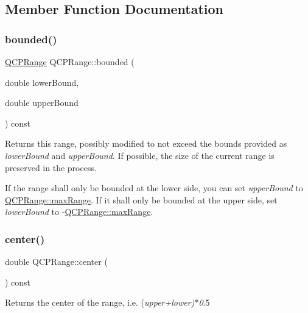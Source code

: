 \subsection{Member Function Documentation}
\mbox{\label{class_q_c_p_range_a22151e18d961d762d25721211e89c2e5}} 
\subsubsection{\texorpdfstring{bounded()}{bounded()}}
{\footnotesize\ttfamily \hyperlink{class_q_c_p_range}{Q\+C\+P\+Range} Q\+C\+P\+Range\+::bounded (\begin{DoxyParamCaption}\item[{double}]{lower\+Bound,  }\item[{double}]{upper\+Bound }\end{DoxyParamCaption}) const}

Returns this range, possibly modified to not exceed the bounds provided as {\itshape lower\+Bound} and {\itshape upper\+Bound}. If possible, the size of the current range is preserved in the process.

If the range shall only be bounded at the lower side, you can set {\itshape upper\+Bound} to \hyperlink{class_q_c_p_range_a34c2817056d5eb5c32524e34a85b4255}{Q\+C\+P\+Range\+::max\+Range}. If it shall only be bounded at the upper side, set {\itshape lower\+Bound} to -\/\hyperlink{class_q_c_p_range_a34c2817056d5eb5c32524e34a85b4255}{Q\+C\+P\+Range\+::max\+Range}. \mbox{\label{class_q_c_p_range_af57d4a37a45d0101177ca30fae5d4ca8}} 
\subsubsection{\texorpdfstring{center()}{center()}}
{\footnotesize\ttfamily double Q\+C\+P\+Range\+::center (\begin{DoxyParamCaption}{ }\end{DoxyParamCaption}) const\hspace{0.3cm}{\ttfamily [inline]}}

Returns the center of the range, i.\+e. ({\itshape upper+{\itshape lower})$\ast$0}.5 \mbox{\label{class_q_c_p_range_ae9842b48b6d38dc5e9607358e3083cc8}} 
